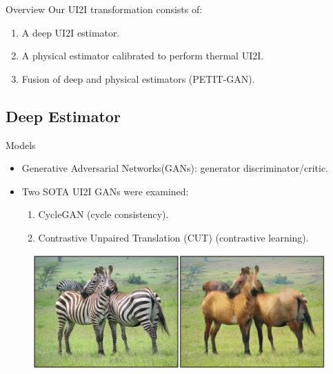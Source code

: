 
\begin{frame}{Overview}
  Our UI2I transformation consists of:
  \begin{enumerate}
    \item A deep UI2I estimator.
    \item A physical estimator calibrated to perform thermal UI2I.
    \item Fusion of deep and physical estimators (PETIT-GAN).
  \end{enumerate}
\end{frame}

\subsection{Deep Estimator}
\begin{frame}{Models}
  \begin{itemize}
    \item Generative Adversarial Networks(GANs): generator \vs discriminator/critic. \hyperlink{apndx:gan}{}
    \item Two SOTA UI2I GANs were examined:
    \begin{enumerate}
      \item CycleGAN \cite{CycleGAN2017} (cycle consistency). \hyperlink{apndx:cycle_gan}{}
      \item Contrastive Unpaired Translation (CUT) \cite{park2020cut} (contrastive learning). \hyperlink{apndx:cat}{}
    \end{enumerate}
  \end{itemize}
  \begin{figure}
    \centering
    \includegraphics[width=0.5\linewidth]{../figs/related_work/horses_to_zebras.png}
  \end{figure}  
\end{frame}

